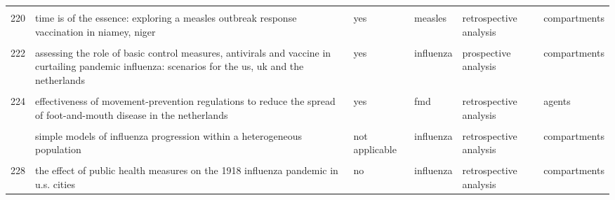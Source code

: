 \documentclass[
]{article}
\begin{document}
\begin{landscape}
\begin{longtable}{l>{\raggedright\arraybackslash}p{3.3cm}l>{\raggedright\arraybackslash}p{3.3cm}>{\raggedright\arraybackslash}p{2cm}l}
\cellcolor{gray!6}{219} & \cellcolor{gray!6}{scenarios of diffusion and control of an influenza pandemic in italy} & \cellcolor{gray!6}{yes} & \cellcolor{gray!6}{influenza} & \cellcolor{gray!6}{prospective analysis} & \cellcolor{gray!6}{compartments}\\
220 & time is of the essence: exploring a measles outbreak response vaccination in niamey, niger & yes & measles & retrospective analysis & compartments\\
\addlinespace
\cellcolor{gray!6}{221} & \cellcolor{gray!6}{a stochastic equation-based model of the value of international air-travel restrictions for controlling pandemic flu} & \cellcolor{gray!6}{not applicable} & \cellcolor{gray!6}{influenza} & \cellcolor{gray!6}{prospective analysis} & \cellcolor{gray!6}{compartments}\\
222 & assessing the role of basic control measures, antivirals and vaccine in curtailing pandemic influenza: scenarios for the us, uk and the netherlands & yes & influenza & prospective analysis & compartments\\
\cellcolor{gray!6}{223} & \cellcolor{gray!6}{deterministic sir (susceptible–infected–removed) models applied to varicella outbreaks} & \cellcolor{gray!6}{yes} & \cellcolor{gray!6}{varicella} & \cellcolor{gray!6}{retrospective analysis} & \cellcolor{gray!6}{agents}\\
224 & effectiveness of movement-prevention regulations to reduce the spread of foot-and-mouth disease in the netherlands & yes & fmd & retrospective analysis & agents\\
\cellcolor{gray!6}{225} & \cellcolor{gray!6}{effects of internal border control on spread of pandemic influenza} & \cellcolor{gray!6}{yes} & \cellcolor{gray!6}{influenza} & \cellcolor{gray!6}{prospective analysis} & \cellcolor{gray!6}{compartments}\\
\addlinespace
226 & simple models of influenza progression within a heterogeneous population & not applicable & influenza & retrospective analysis & compartments\\
\cellcolor{gray!6}{227} & \cellcolor{gray!6}{stochastic model of an influenza epidemic with drug resistance} & \cellcolor{gray!6}{not applicable} & \cellcolor{gray!6}{influenza} & \cellcolor{gray!6}{prospective analysis} & \cellcolor{gray!6}{compartments}\\
228 & the effect of public health measures on the 1918 influenza pandemic in u.s. cities & no & influenza & retrospective analysis & compartments\\

\end{longtable}
\end{landscape}
\end{document}

